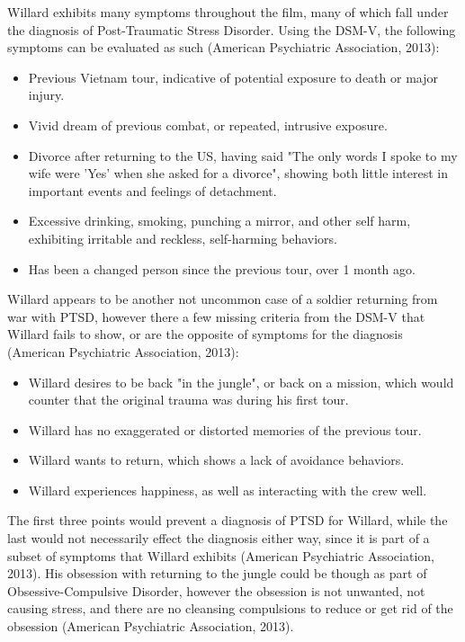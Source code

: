 \documentclass[a4paper,man,natbib]{apa6}
\begin{document}
Willard exhibits many symptoms throughout the film, many of which fall under the diagnosis of Post-Traumatic Stress Disorder. Using the DSM-V, the following symptoms can be evaluated as such (American Psychiatric Association, 2013):
\begin{itemize}
\item Previous Vietnam tour, indicative of potential exposure to death or major injury.
\item Vivid dream of previous combat, or repeated, intrusive exposure.
\item Divorce after returning to the US, having said "The only words I spoke to my wife were 'Yes' when she asked for a divorce", showing both little interest in important events and feelings of detachment.
\item Excessive drinking, smoking, punching a mirror, and other self harm, exhibiting irritable and reckless, self-harming behaviors.
\item Has been a changed person since the previous tour, over 1 month ago.
\end{itemize} 
Willard appears to be another not uncommon case of a soldier returning from war with PTSD, however there a few missing criteria from the DSM-V that Willard fails to show, or are the opposite of symptoms for the diagnosis (American Psychiatric Association, 2013):
\begin{itemize}
\item Willard desires to be back "in the jungle", or back on a mission, which would counter that the original trauma was during his first tour.
\item Willard has no exaggerated or distorted memories of the previous tour.
\item Willard wants to return, which shows a lack of avoidance behaviors.
\item Willard experiences happiness, as well as interacting with the crew well.
\end{itemize}
The first three points would prevent a diagnosis of PTSD for Willard, while the last would not necessarily effect the diagnosis either way, since it is part of a subset of symptoms that Willard exhibits (American Psychiatric Association, 2013). His obsession with returning to the jungle could be though as part of Obsessive-Compulsive Disorder, however the obsession is not unwanted, not causing stress, and there are no cleansing compulsions to reduce or get rid of the obsession (American Psychiatric Association, 2013).
\end{document}
